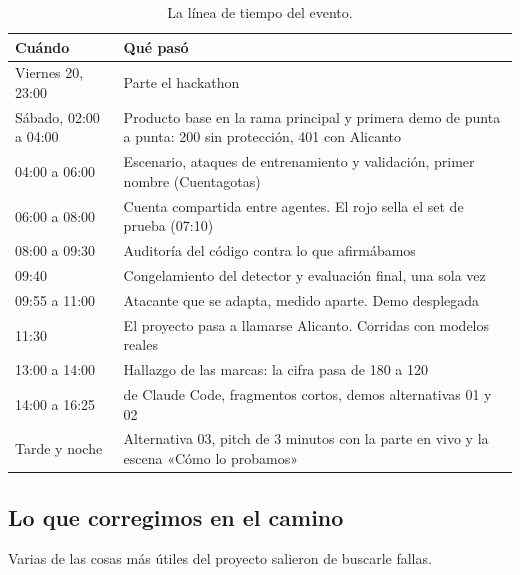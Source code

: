 \begin{table}[ht]
\caption{La línea de tiempo del evento.}\label{tab:tiempo}
\small
\begin{tabularx}{\textwidth}{@{}P{3.6cm}L@{}}
\toprule
Cuándo & Qué pasó \\
\midrule
Viernes 20, 23:00 & Parte el hackathon \\
Sábado, 02:00 a 04:00 & Producto base en la rama principal y primera demo de punta a punta: 200 sin
  protección, 401 con Alicanto \\
04:00 a 06:00 & Escenario, ataques de entrenamiento y validación, primer nombre (Cuentagotas) \\
06:00 a 08:00 & Cuenta compartida entre agentes. El rojo sella el set de prueba (07:10) \\
08:00 a 09:30 & Auditoría del código contra lo que afirmábamos \\
09:40 & Congelamiento del detector y evaluación final, una sola vez \\
09:55 a 11:00 & Atacante que se adapta, medido aparte. Demo desplegada \\
11:30 & El proyecto pasa a llamarse Alicanto. Corridas con modelos reales \\
13:00 a 14:00 & Hallazgo de las marcas: la cifra pasa de 180 a 120 \\
14:00 a 16:25 &  de Claude Code, fragmentos cortos, demos alternativas 01 y 02 \\
Tarde y noche & Alternativa 03, pitch de 3 minutos con la parte en vivo y la escena «Cómo lo
  probamos» \\
\bottomrule
\end{tabularx}
\end{table}

\subsection{Lo que corregimos en el camino}

Varias de las cosas más útiles del proyecto salieron de buscarle fallas.

